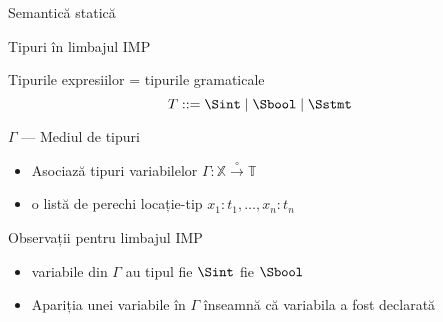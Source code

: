 \documentclass[xcolor=pdftex,romanian,colorlinks]{beamer}
\begin{document}
\begin{section}{Semantică statică}
    \begin{frame}{Tipuri în limbajul IMP}
    \begin{block}{Tipurile expresiilor = tipurile gramaticale}
    \[T ::= {\Sint} \mid {\Sbool} \mid \Sstmt\]
    \end{block}
    \begin{block}{$\Gamma$ --- Mediul de tipuri}
    \begin{itemize}
    \item Asociază tipuri variabilelor
    \(\Gamma : \mathbb{X} \xrightarrow{\circ}\mathbb{T}\)
    \item {} o listă de perechi locație-tip
    \(x_1:t_1, \ldots, x_n:t_n\)
    \end{itemize}
  \end{block}
    \vfill
    \begin{block}{Observații pentru limbajul IMP}
    \begin{itemize}
    \item variabile din $\Gamma$  au tipul fie $\Sint$ fie $\Sbool$
    \item Apariția unei variabile în $\Gamma$ înseamnă că variabila a fost declarată
    \end{itemize}
    \end{block}
    \end{frame}


\end{section}
\end{document}
